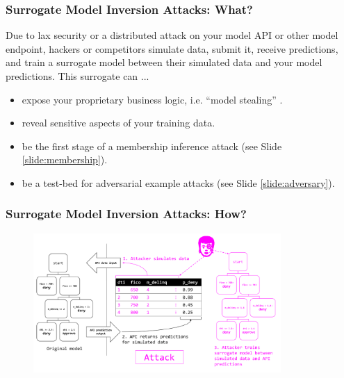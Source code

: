\documentclass[11pt,
               aspectratio=169,
               hyperref={colorlinks}
               ]{beamer}
\begin{document}
			\begin{frame}
		
				\frametitle{Surrogate Model Inversion Attacks: \textbf{What?}}
				
Due to lax security or a distributed attack on your model API or other model endpoint, hackers or competitors simulate data, submit it, receive predictions, and train a surrogate model between their simulated data and your model predictions. This surrogate can ...
				\vspace{10pt}
				\begin{itemize}
				\item expose your proprietary business logic, i.e. ``model stealing'' \cite{model_stealing}. 
				\item reveal sensitive aspects of your training data. 
				\item be the first stage of a membership inference attack (see Slide \ref{slide:membership}).
				\item be a test-bed for adversarial example attacks (see Slide \ref{slide:adversary}). 
				\end{itemize}

			\end{frame}
		
			\begin{frame}[label={slide:inversion}]
		
				\frametitle{Surrogate Model Inversion Attacks: \textbf{How?}}	
			
				\begin{figure}[htb]
					\begin{center}
						\includegraphics[height=150pt]{img/inversion.PNG}
					\end{center}
				\end{figure}	

			\end{frame}
		
\end{document}
